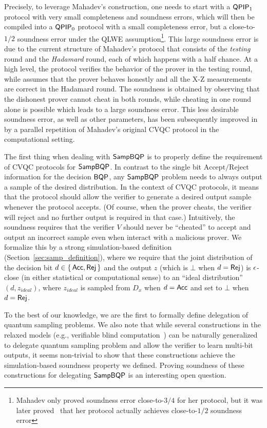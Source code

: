 Precisely, to leverage Mahadev's construction, one needs to start with a $\operatorname{\mathsf{QPIP}}_1$ protocol with very small completeness and soundness errors, which will then be compiled into a $\operatorname{\mathsf{QPIP}}_0$ protocol with a small completeness error, but a close-to-$1/2$ soundness error under the QLWE assumption\footnote{Mahadev only proved soundness error close-to-$3/4$ for her protocol, but it was later proved~\cite{arXiv:ChiaChungYam19, arXiv:AlaChiHun19} that her protocol actually achieves close-to-$1/2$ soundness error}.  
This large soundness error is due to the current structure of Mahadev's protocol that consists of the \emph{testing} round and the \emph{Hadamard} round, each of which happens with a half chance. 
At a high level, the protocol verifies the behavior of the prover in the testing round, while assumes that the prover behaves honestly and all the X-Z measurements are correct in the Hadamard round. 
The soundness is obtained by observing that the dishonest prover cannot cheat in both rounds, while cheating in one round alone is possible which leads to a large soundness error. 
This less desirable soundness error, as well as other parameters, has been subsequently improved in \cite{arXiv:AlaChiHun19, arXiv:ChiaChungYam19} by a parallel repetition of Mahadev's original CVQC protocol in the computational setting. 

The first thing when dealing with $\operatorname{\mathsf{SampBQP}}$ is to properly define the requirement of CVQC protocols for $\operatorname{\mathsf{SampBQP}}$. 
In contrast to the single bit $\mathrm{Accept/Reject}$ information for the decision $\operatorname{\mathsf{BQP}}$, any $\operatorname{\mathsf{SampBQP}}$ problem needs to always output a sample of the desired distribution.
In the context of CVQC protocols, it means that the protocol should allow the verifier to generate a desired output sample whenever the protocol accepts. 
(Of course, when the prover cheats, the verifier will reject and no further output is required in that case.)
Intuitively, the soundness requires that the verifier $V$ should never be ``cheated'' to accept and output an incorrect sample even when interact with a malicious prover. We formalize this by a strong simulation-based definition (Section~\ref{sec:samp_definition}), where we require that the joint distribution of the decision bit $d \in \set{\mathsf{Acc}, \mathsf{Rej}}$ and the output $z$ (which is $\bot$ when $d = \mathsf{Rej}$) is $\epsilon$-close (in either statistical or computational sense) to an ``ideal distribution'' $(d,z_{ideal})$, where $z_{ideal}$ is sampled from $D_x$ when $d = \mathsf{Acc}$ and set to $\bot$ when $d = \mathsf{Rej}$.

To the best of our knowledge, we are the first to formally define delegation of quantum sampling problems. We also note that while several constructions in the relaxed models (e.g., verifiable blind computation~\cite{FK17}) can be naturally generalized to delegate quantum sampling problem and allow the verifier to learn multi-bit outputs, it seems non-trivial to show that these constructions achieve the simulation-based soundness property we defined. Proving soundness of these constructions for delegating $\operatorname{\mathsf{SampBQP}}$ is an interesting open question.

